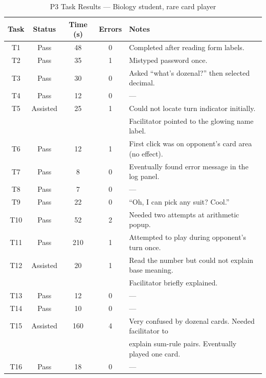 \documentclass[12pt, titlepage]{article}
\begin{document}
\begin{table}[H]
\centering
\caption{P3 Task Results --- Biology student, rare card player}
\label{tab:p3-raw}
\begin{tabular}{c c c c l}
\toprule
\textbf{Task} & \textbf{Status} & \textbf{Time (s)} & \textbf{Errors} & \textbf{Notes} \\
\midrule
T1  & Pass     & 48  & 0 & Completed after reading form labels. \\
T2  & Pass     & 35  & 1 & Mistyped password once. \\
T3  & Pass     & 30  & 0 & Asked ``what's dozenal?'' then selected decimal. \\
T4  & Pass     & 12  & 0 & --- \\
T5  & Assisted & 25  & 1 & Could not locate turn indicator initially. \\
     &          &     &   & Facilitator pointed to the glowing name label. \\
T6  & Pass     & 12  & 1 & First click was on opponent's card area (no effect). \\
T7  & Pass     & 8   & 0 & Eventually found error message in the log panel. \\
T8  & Pass     & 7   & 0 & --- \\
T9  & Pass     & 22  & 0 & ``Oh, I can pick any suit? Cool.'' \\
T10 & Pass     & 52  & 2 & Needed two attempts at arithmetic popup. \\
T11 & Pass     & 210 & 1 & Attempted to play during opponent's turn once. \\
T12 & Assisted & 20  & 1 & Read the number but could not explain base meaning. \\
     &          &     &   & Facilitator briefly explained. \\
T13 & Pass     & 12  & 0 & --- \\
T14 & Pass     & 10  & 0 & --- \\
T15 & Assisted & 160 & 4 & Very confused by dozenal cards. Needed facilitator to \\
     &          &     &   & explain sum-rule pairs. Eventually played one card. \\
T16 & Pass     & 18  & 0 & --- \\
\bottomrule
\end{tabular}
\end{table}
\end{document}
